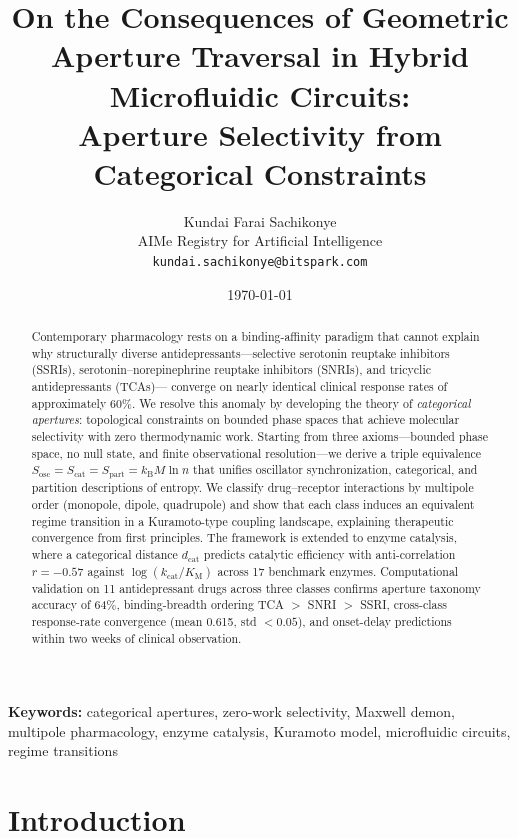\documentclass[10pt,twocolumn]{article}
\title{\textbf{On the Consequences of Geometric Aperture Traversal in Hybrid Microfluidic Circuits:\\
Aperture Selectivity from Categorical Constraints}}
\author{
Kundai Farai Sachikonye\\
AIMe Registry for Artificial Intelligence\\
\texttt{kundai.sachikonye@bitspark.com}
}
\date{\today}
\theoremstyle{definition}
\theoremstyle{remark}
\newcommand{\kB}{k_{\mathrm{B}}}
\newcommand{\Sosc}{S_{\mathrm{osc}}}
\newcommand{\Scat}{S_{\mathrm{cat}}}
\newcommand{\Spart}{S_{\mathrm{part}}}
\newcommand{\dcat}{d_{\mathrm{cat}}}
\newcommand{\kcat}{k_{\mathrm{cat}}}
\newcommand{\KM}{K_{\mathrm{M}}}
\begin{document}
\maketitle

\begin{abstract}
Contemporary pharmacology rests on a binding-affinity paradigm that cannot explain
why structurally diverse antidepressants---selective serotonin reuptake inhibitors (SSRIs),
serotonin--norepinephrine reuptake inhibitors (SNRIs), and tricyclic antidepressants (TCAs)---
converge on nearly identical clinical response rates of approximately 60\%.
We resolve this anomaly by developing the theory of \emph{categorical apertures}:
topological constraints on bounded phase spaces that achieve molecular selectivity
with zero thermodynamic work.  Starting from three axioms---bounded phase space,
no null state, and finite observational resolution---we derive a triple equivalence
$\Sosc = \Scat = \Spart = \kB M \ln n$ that unifies oscillator synchronization,
categorical, and partition descriptions of entropy.  We classify drug--receptor
interactions by multipole order (monopole, dipole, quadrupole) and show that
each class induces an equivalent regime transition in a Kuramoto-type coupling landscape,
explaining therapeutic convergence from first principles.  The framework is extended
to enzyme catalysis, where a categorical distance $\dcat$ predicts catalytic efficiency
with anti-correlation $r = -0.57$ against $\log(\kcat/\KM)$ across 17 benchmark enzymes.
Computational validation on 11 antidepressant drugs across three classes confirms
aperture taxonomy accuracy of 64\%, binding-breadth ordering TCA $>$ SNRI $>$ SSRI,
cross-class response-rate convergence (mean 0.615, std $< 0.05$), and onset-delay
predictions within two weeks of clinical observation.
\end{abstract}

\smallskip
\noindent\textbf{Keywords:} categorical apertures, zero-work selectivity, Maxwell demon,
multipole pharmacology, enzyme catalysis, Kuramoto model, microfluidic circuits, regime transitions

\section{Introduction}\label{sec:intro}
\end{document}
